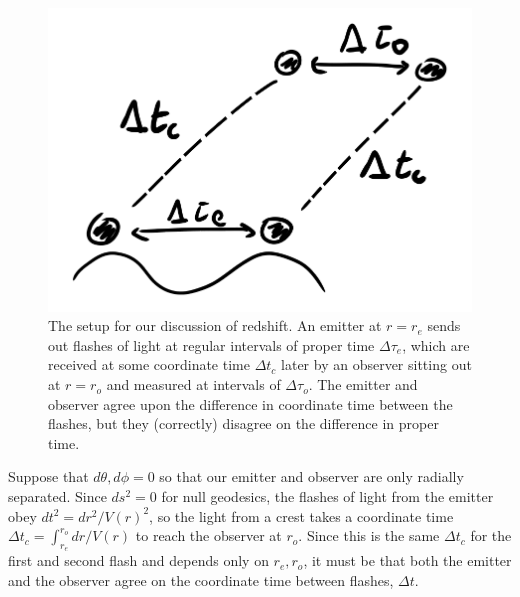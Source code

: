 \begin{figure}
    \centering
    \includegraphics{michaelmas/gr/2018/11/20181109_redshift.png}
    \caption{The setup for our discussion of redshift. An emitter at $r=r_e$ sends out flashes of light at regular intervals of proper time $\Delta \tau_e$, which are received at some coordinate time $\Delta t_c$ later by an observer sitting out at $r=r_o$ and measured at intervals of $\Delta \tau_o$. The emitter and observer agree upon the difference in coordinate time between the flashes, but they (correctly) disagree on the difference in proper time.}
    \label{fig:gravitationalredshift}
\end{figure}

Suppose that $d\theta,d\phi=0$ so that our emitter and observer are only radially separated. Since $ds^2=0$ for null geodesics, the flashes of light from the emitter obey $dt^2=dr^2/V(r)^2$, so the light from a crest takes a coordinate time $\Delta t_c=\int_{r_e}^{r_o}dr/V(r)$ to reach the observer at $r_o$. Since this is the same $\Delta t_c$ for the first and second flash and depends only on $r_e,r_o$, it must be that both the emitter and the observer agree on the coordinate time between flashes, $\Delta t$.

